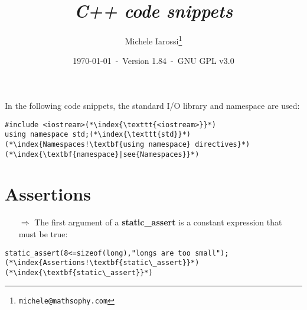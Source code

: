 \documentclass[10pt]{article}
\begin{document}
\title{\emph{C++ code snippets}}
\author{Michele Iarossi\thanks{\texttt{michele@mathsophy.com}}}
\date{\small \today~-~Version 1.84~-~GNU GPL v3.0}


\maketitle

\small

\begin{frame}{}
\setlength\columnsep{1cm}
\begin{multicols}{2}
\tableofcontents
\end{multicols}
\end{frame}
\newpage
\noindent
In the following code snippets, the standard I/O library and namespace are used:
\begin{lstlisting}
#include <iostream>(*\index{\texttt{<iostream>}}*)
using namespace std;(*\index{\texttt{std}}*)(*\index{Namespaces!\textbf{using namespace} directives}*)(*\index{\textbf{namespace}|see{Namespaces}}*)
\end{lstlisting}
%
%
\section{Assertions}
\small
\begin{enumerate}
\item[$\Rightarrow$] The first argument of a \textbf{static\_assert} is a constant expression that must be true:
\end{enumerate}
\begin{lstlisting}
static_assert(8<=sizeof(long),"longs are too small");(*\index{Assertions!\textbf{static\_assert}}*)(*\index{\textbf{static\_assert}}*)
\end{lstlisting}
%
%
\end{document}
